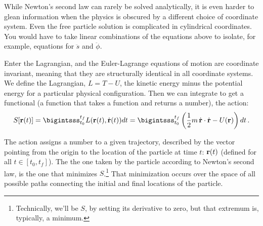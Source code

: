 While Newton's second law can rarely be solved analytically, it is even harder to glean information when the physics is obscured by a different choice of coordinate system. Even the free particle solution is complicated in cylindrical coordinates. You would have to take linear combinations of the equations above to isolate, for example, equations for $\ddot{s}$ and $\ddot{\phi}$. 

Enter the Lagrangian, and the Euler-Lagrange equations of motion are coordinate invariant, meaning that they are structurally identical in all coordinate systems. We define the Lagrangian, $L = T - U$, the kinetic energy minus the potential energy for a particular physical configuration. Then we can integrate to get a functional (a function that takes a function and returns a number), the action:
\begin{equation}\label{eq:JFrank_CFT_3.4}
S[\vb{r}(t)] = \bigintsss_{t_0}^{t_f} L(\vb{r}(t), \dot{\vb{r}}(t)) dt =
\bigintsss_{t_0}^{t_f} \left(\frac{1}{2} m \, \dot{\vb{r}} \cdot \dot{\vb{r}} - U(\vb{r})\right) dt\,.
\end{equation}

The action assigns a number to a given trajectory, described by the vector pointing from the origin to the location of the particle at time $t$: $\vb{r}(t)$ (defined for all $t \in [t_0, t_f]$). The  the one taken by the particle according to Newton's second law, is the one that minimizes $S$.\footnote{Technically, we'll be  $S$, by setting its derivative to zero, but that extremum is, typically, a minimum.} That minimization occurs over the space of all possible paths connecting the initial and final locations of the particle.

